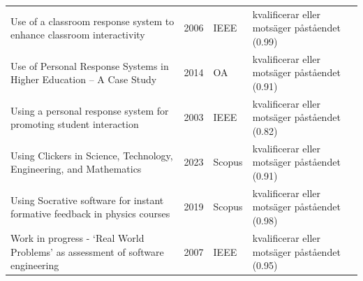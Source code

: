 \begin{longtable}{@{}%
  >{\raggedright\arraybackslash}p{}c%
  >{\raggedright\arraybackslash}p{}%
  >{\raggedright\arraybackslash}p{}@{}}
Use of a classroom response system to enhance classroom interactivity & 2006 & IEEE & kvalificerar eller motsäger påståendet (0.99) \\
Use of Personal Response Systems in Higher Education -- A Case Study & 2014 & OA & kvalificerar eller motsäger påståendet (0.91) \\
Using a personal response system for promoting student interaction & 2003 & IEEE & kvalificerar eller motsäger påståendet (0.82) \\
Using Clickers in Science, Technology, Engineering, and Mathematics & 2023 & Scopus & kvalificerar eller motsäger påståendet (0.91) \\
Using Socrative software for instant formative feedback in physics courses & 2019 & Scopus & kvalificerar eller motsäger påståendet (0.98) \\
Work in progress - `Real World Problems' as assessment of software engineering & 2007 & IEEE & kvalificerar eller motsäger påståendet (0.95) \\
\end{longtable}
\endgroup
